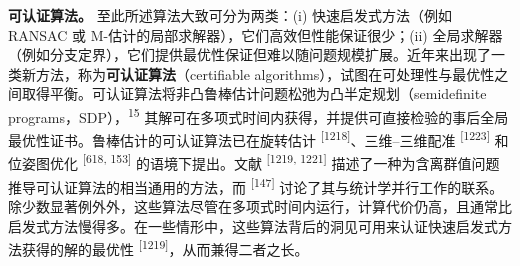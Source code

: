 \textbf{可认证算法。} 至此所述算法大致可分为两类：(i) 快速启发式方法（例如 RANSAC 或 M-估计的局部求解器），它们高效但性能保证很少；(ii) 全局求解器（例如分支定界），它们提供最优性保证但难以随问题规模扩展。近年来出现了一类新方法，称为\textbf{可认证算法}（certifiable algorithms），试图在可处理性与最优性之间取得平衡。可认证算法将非凸鲁棒估计问题松弛为凸半定规划（semidefinite programs，SDP），\textsuperscript{15} 其解可在多项式时间内获得，并提供可直接检验的事后全局最优性证书。鲁棒估计的可认证算法已在旋转估计 \textsuperscript{[1218]}、三维–三维配准 \textsuperscript{[1223]} 和位姿图优化 \textsuperscript{[618, 153]} 的语境下提出。文献 \textsuperscript{[1219, 1221]} 描述了一种为含离群值问题推导可认证算法的相当通用的方法，而 \textsuperscript{[147]} 讨论了其与统计学并行工作的联系。除少数显著例外外，这些算法尽管在多项式时间内运行，计算代价仍高，且通常比启发式方法慢得多。在一些情形中，这些算法背后的洞见可用来认证快速启发式方法获得的解的最优性 \textsuperscript{[1219]}，从而兼得二者之长。
